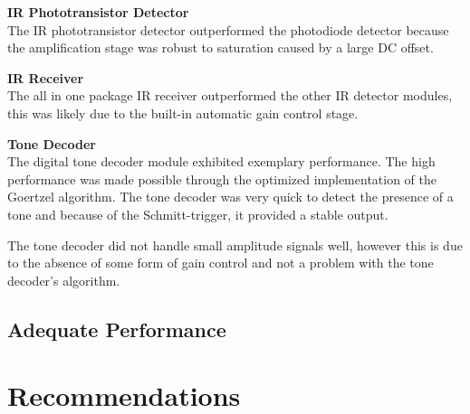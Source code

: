 \textbf{IR Phototransistor Detector}\\
The IR phototransistor detector outperformed the photodiode detector because the amplification stage was robust to saturation caused by a large DC offset.

\textbf{IR Receiver}\\
The all in one package IR receiver outperformed the other IR detector modules, this was likely due to the built-in automatic gain control stage.

\textbf{Tone Decoder}\\ %
The digital tone decoder module exhibited exemplary performance. The high performance was made possible through the optimized implementation of the Goertzel algorithm. The tone decoder was very quick to detect the presence of a tone and because of the Schmitt-trigger, it provided a stable output.

The tone decoder did not handle small amplitude signals well, however this is due to the absence of some form of gain control and not a problem with the tone decoder's algorithm.

\subsection{Adequate Performance}





\section{Recommendations}



